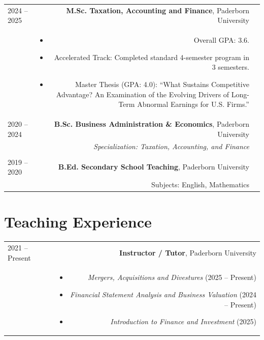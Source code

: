 \documentclass[11pt, a4paper]{article}
\newcommand{\entrygap}{\\[12pt]}
\newcommand{\liftlist}{\vspace*{-0.6em}}
\begin{document}
\begin{longtable}{L R}
    2024 -- 2025 & \textbf{M.Sc. Taxation, Accounting and Finance}, Paderborn University \\
    & \liftlist
      \begin{itemize}[nosep, leftmargin=*, itemsep=1.5pt] 
        \item {Overall GPA: 3.6}.
        \item Accelerated Track: Completed standard 4-semester program in 3 semesters.
        \item Master Thesis (GPA: 4.0): ``What Sustains Competitive Advantage? An Examination of the Evolving Drivers of Long-Term Abnormal Earnings for U.S. Firms.''
      \end{itemize} \entrygap
    
    2020 -- 2024 & \textbf{B.Sc. Business Administration \& Economics}, Paderborn University \\
    & \emph{Specialization: Taxation, Accounting, and Finance} \\
    
    \\[2pt] 
    2019 -- 2020 & \textbf{B.Ed. Secondary School Teaching}, Paderborn University \\
    & Subjects: English, Mathematics \\
\end{longtable}

\newpage 

\section*{Teaching Experience}

\begin{longtable}{L R}
    2021 -- Present & \textbf{Instructor / Tutor}, Paderborn University \\
    & \liftlist
      \begin{itemize}[nosep, leftmargin=*, itemsep=1.5pt]
        \item \emph{Mergers, Acquisitions and Divestures} (2025 -- Present)
        \item \emph{Financial Statement Analysis and Business Valuation} (2024 -- Present)
        \item \emph{Introduction to Finance and Investment} (2025)
      \end{itemize} \\
\end{longtable}
\end{document}
